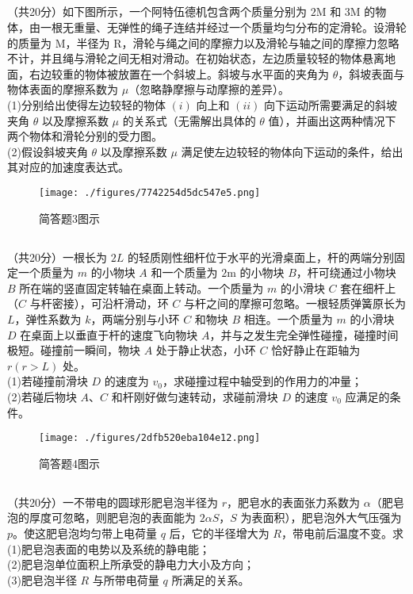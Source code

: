 \subsection{ }
（共20分）如下图所示，一个阿特伍德机包含两个质量分别为 $2\mathrm{M}$ 和 $3\mathrm{M}$ 的物体，由一根无重量、无弹性的绳子连结并经过一个质量均匀分布的定滑轮。设滑轮的质量为 $\mathrm{M}$，半径为 $\mathrm{R}$，滑轮与绳之间的摩擦力以及滑轮与轴之间的摩擦力忽略不计，并且绳与滑轮之间无相对滑动。在初始状态，左边质量较轻的物体悬离地面，右边较重的物体被放置在一个斜坡上。斜坡与水平面的夹角为 $\theta$，斜坡表面与物体表面的摩擦系数为 $\mu$（忽略静摩擦与动摩擦的差异）。\\
(1)分别给出使得左边较轻的物体 $(i)$ 向上和 $(ii)$ 向下运动所需要满足的斜坡夹角 $\theta$ 以及摩擦系数 $\mu$ 的关系式（无需解出具体的 $\theta$ 值），并画出这两种情况下两个物体和滑轮分别的受力图。\\
(2)假设斜坡夹角 $\theta$ 以及摩擦系数 $\mu$ 满足使左边较轻的物体向下运动的条件，给出其对应的加速度表达式。\\
\begin{figure}[ht]
\centering
\texttt{[image: ./figures/7742254d5dc547e5.png]}
\caption{简答题3图示} \label{fig_CAS17_4}
\end{figure}
\subsection{ }
（共20分）一根长为 $2L$ 的轻质刚性细杆位于水平的光滑桌面上，杆的两端分别固定一个质量为 $m$ 的小物块 $A$ 和一个质量为 $2\mathrm{m}$ 的小物块 $B$，杆可绕通过小物块 $B$ 所在端的竖直固定转轴在桌面上转动。一个质量为 $m$ 的小滑块 $C$ 套在细杆上（$C$ 与杆密接），可沿杆滑动，环 $C$ 与杆之间的摩擦可忽略。一根轻质弹簧原长为 $L$，弹性系数为 $k$，两端分别与小环 $C$ 和物块 $B$ 相连。一个质量为 $m$ 的小滑块 $D$ 在桌面上以垂直于杆的速度飞向物块 $A$，并与之发生完全弹性碰撞，碰撞时间极短。碰撞前一瞬间，物块 $A$ 处于静止状态，小环 $C$ 恰好静止在距轴为 $r(r>L)$ 处。\\
(1)若碰撞前滑块 $D$ 的速度为 $v_{0}$，求碰撞过程中轴受到的作用力的冲量；\\
(2)若碰后物块 $A$、$C$ 和杆刚好做匀速转动，求碰前滑块 $D$ 的速度 $v_{0}$ 应满足的条件。\\
\begin{figure}[ht]
\centering
\texttt{[image: ./figures/2dfb520eba104e12.png]}
\caption{简答题4图示} \label{fig_CAS17_5}
\end{figure}
\subsection{ }
（共20分）一不带电的圆球形肥皂泡半径为 $r$，肥皂水的表面张力系数为 $\alpha$（肥皂泡的厚度可忽略，则肥皂泡的表面能为 $2 \alpha S$，$S$ 为表面积），肥皂泡外大气压强为 $p$。使这肥皂泡均匀带上电荷量 $q$ 后，它的半径增大为 $R$，带电前后温度不变。求\\
(1)肥皂泡表面的电势以及系统的静电能；\\
(2)肥皂泡单位面积上所承受的静电力大小及方向；\\
(3)肥皂泡半径 $R$ 与所带电荷量 $q$ 所满足的关系。\\
